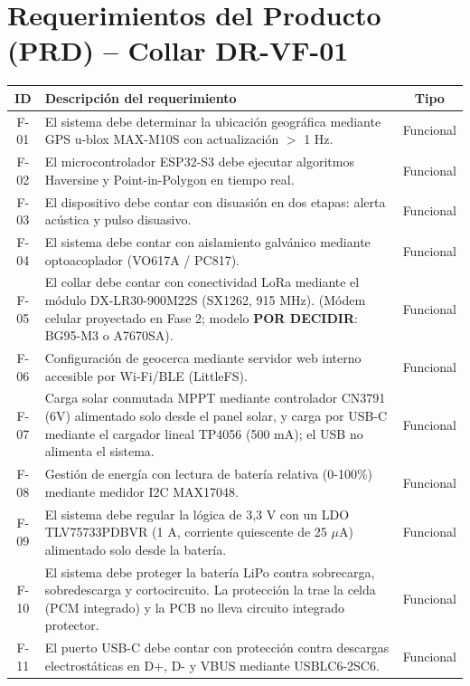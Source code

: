 \section*{Requerimientos del Producto (PRD) -- Collar DR-VF-01}

\begin{table}[H]
\centering
\small
\begin{tabularx}{\textwidth}{|c X c|}
\hline
\rowcolor{categorybg}
\textbf{ID} & \textbf{Descripción del requerimiento} & \textbf{Tipo} \\ \hline
F-01 & El sistema debe determinar la ubicación geográfica mediante GPS u-blox MAX-M10S con actualización $>$ 1 Hz. & Funcional \\ \hline
F-02 & El microcontrolador ESP32-S3 debe ejecutar algoritmos Haversine y Point-in-Polygon en tiempo real. & Funcional \\ \hline
F-03 & El dispositivo debe contar con disuasión en dos etapas: alerta acústica y pulso disuasivo. & Funcional \\ \hline
F-04 & El sistema debe contar con aislamiento galvánico mediante optoacoplador (VO617A / PC817). & Funcional \\ \hline
F-05 & El collar debe contar con conectividad LoRa mediante el módulo DX-LR30-900M22S (SX1262, 915 MHz). (Módem celular proyectado en Fase 2; modelo \textbf{POR DECIDIR}: BG95-M3 o A7670SA). & Funcional \\ \hline
F-06 & Configuración de geocerca mediante servidor web interno accesible por Wi-Fi/BLE (LittleFS). & Funcional \\ \hline
F-07 & Carga solar conmutada MPPT mediante controlador CN3791 (6V) alimentado solo desde el panel solar, y carga por USB-C mediante el cargador lineal TP4056 (500 mA); el USB no alimenta el sistema. & Funcional \\ \hline
F-08 & Gestión de energía con lectura de batería relativa (0-100\%) mediante medidor I2C MAX17048. & Funcional \\ \hline
F-09 & El sistema debe regular la lógica de 3,3 V con un LDO TLV75733PDBVR (1 A, corriente quiescente de 25 $\mu$A) alimentado solo desde la batería. & Funcional \\ \hline
F-10 & El sistema debe proteger la batería LiPo contra sobrecarga, sobredescarga y cortocircuito. La protección la trae la celda (PCM integrado) y la PCB no lleva circuito integrado protector. & Funcional \\ \hline
F-11 & El puerto USB-C debe contar con protección contra descargas electrostáticas en D+, D- y VBUS mediante USBLC6-2SC6. & Funcional \\ \hline

\end{tabularx}
\end{table}
